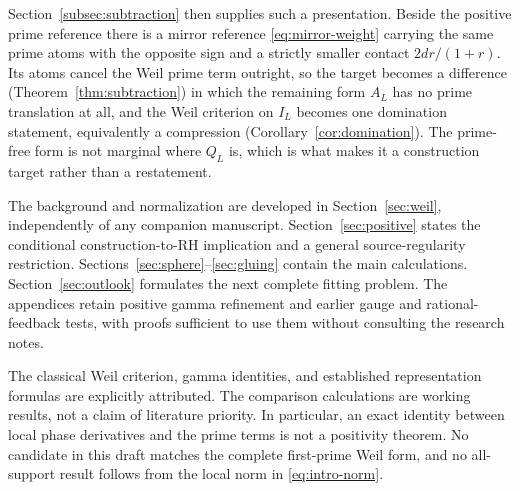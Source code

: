 Section~\ref{subsec:subtraction} then supplies such a presentation. Beside
the positive prime reference there is a mirror reference
\eqref{eq:mirror-weight} carrying the same prime atoms with the opposite sign
and a strictly smaller contact $2dr/(1+r)$. Its atoms cancel the Weil prime
term outright, so the target becomes a difference
(Theorem~\ref{thm:subtraction}) in which the remaining form $A_L$ has no
prime translation at all, and the Weil criterion on $I_L$ becomes one
domination statement, equivalently a compression
(Corollary~\ref{cor:domination}). The prime-free form is not marginal where
$Q_L$ is, which is what makes it a construction target rather than a
restatement.

The background and normalization are developed in
Section~\ref{sec:weil}, independently of any companion manuscript.
Section~\ref{sec:positive} states the conditional construction-to-RH
implication and a general source-regularity restriction.
Sections~\ref{sec:sphere}--\ref{sec:gluing} contain the main calculations.
Section~\ref{sec:outlook} formulates the next complete fitting problem.
The appendices retain positive gamma refinement and earlier gauge and
rational-feedback tests, with proofs sufficient to use them without
consulting the research notes.

The classical Weil criterion, gamma identities, and established
representation formulas are explicitly attributed. The comparison
calculations are working results, not a claim of literature priority.
In particular, an exact identity between local phase derivatives and
the prime terms is not a positivity theorem. No candidate in this draft
matches the complete first-prime Weil form, and no all-support result
follows from the local norm in \eqref{eq:intro-norm}.
